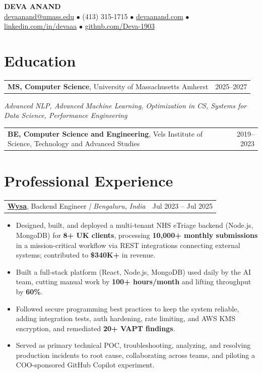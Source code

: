 \documentclass[letterpaper,11pt]{article}
\makeatletter
\newcommand{\eduItem}[3]{%
  \begin{tabular*}{\textwidth}{@{}l@{\extracolsep{\fill}}r@{}}
    \textbf{#1}, #2 & #3 \\
  \end{tabular*}\par
}
\newcommand{\expItem}[4]{%
  \vspace{3pt}
  \begin{tabular*}{\textwidth}{@{}l@{\extracolsep{\fill}}r@{}}
    \textbf{#1}, #2 \textit{| #3} & #4 \\
  \end{tabular*}\par\vspace{-2pt}
}
\makeatother
\begin{document}
\begin{center}
    {\fontsize{18}{20}\selectfont\bfseries DEVA ANAND}\\ \vspace{3pt}
    {\small
    \href{mailto:devaanand@umass.edu}{devaanand@umass.edu}
    \enspace$\bullet$\enspace
    (413) 315-1715
    \enspace$\bullet$\enspace
    \href{https://devaanand.com}{devaanand.com}
    \enspace$\bullet$\enspace
    \href{https://linkedin.com/in/devaaa/}{linkedin.com/in/devaaa}
    \enspace$\bullet$\enspace
    \href{https://github.com/Deva-1903}{github.com/Deva-1903}}
\end{center}
\vspace{-6pt}

\section{Education}
\eduItem{MS, Computer Science}{University of Massachusetts Amherst}{2025--2027}
{\small\textit{Advanced NLP, Advanced Machine Learning, Optimization in CS, Systems for Data Science, Performance Engineering}}\par
\vspace{3pt}
\eduItem{BE, Computer Science and Engineering}{Vels Institute of Science, Technology and Advanced Studies}{2019--2023}

\section{Professional Experience}

\expItem{\href{https://www.wysa.io}{Wysa}}{Backend Engineer}{Bengaluru, India}{Jul 2023 -- Jul 2025}
\begin{itemize}
  \item Designed, built, and deployed a multi-tenant NHS eTriage backend (Node.js, MongoDB) for \textbf{8+ UK clients}, processing \textbf{10{,}000+ monthly submissions} in a mission-critical workflow via REST integrations connecting external systems; contributed to \textbf{\$340K+} in revenue.
  \item Built a full-stack platform (React, Node.js, MongoDB) used daily by the AI team, cutting manual work by \textbf{100+ hours/month} and lifting throughput by \textbf{60\%}.
  \item Followed secure programming best practices to keep the system reliable, adding integration tests, auth hardening, rate limiting, and AWS KMS encryption, and remediated \textbf{20+ VAPT findings}.
  \item Served as primary technical POC, troubleshooting, analyzing, and resolving production incidents to root cause, collaborating across teams, and piloting a COO-sponsored GitHub Copilot experiment.
\end{itemize}
\end{document}
